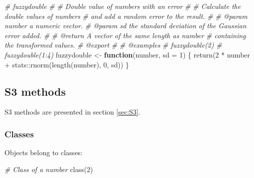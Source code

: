 \documentclass[
  12pt,
  american,
  a4paper,
  extrafontsizes,onecolumn,openright
  ]{memoir}
\newenvironment{Shaded}{\begin{snugshade}}{\end{snugshade}}
\newcommand{\AttributeTok}[1]{\textcolor[rgb]{0.77,0.63,0.00}{#1}}
\newcommand{\CommentTok}[1]{\textcolor[rgb]{0.56,0.35,0.01}{\textit{#1}}}
\newcommand{\ControlFlowTok}[1]{\textcolor[rgb]{0.13,0.29,0.53}{\textbf{#1}}}
\newcommand{\DecValTok}[1]{\textcolor[rgb]{0.00,0.00,0.81}{#1}}
\newcommand{\FunctionTok}[1]{\textcolor[rgb]{0.00,0.00,0.00}{#1}}
\newcommand{\NormalTok}[1]{#1}
\newcommand{\OtherTok}[1]{\textcolor[rgb]{0.56,0.35,0.01}{#1}}
\newcommand{\SpecialCharTok}[1]{\textcolor[rgb]{0.00,0.00,0.00}{#1}}
\begin{document}
\begin{Shaded}
\begin{Highlighting}[]
\CommentTok{\#\textquotesingle{} fuzzydouble}
\CommentTok{\#\textquotesingle{} }
\CommentTok{\#\textquotesingle{} Double value of numbers with an error}
\CommentTok{\#\textquotesingle{} }
\CommentTok{\#\textquotesingle{} Calculate the double values of numbers }
\CommentTok{\#\textquotesingle{} and add a random error to the result.}
\CommentTok{\#\textquotesingle{}}
\CommentTok{\#\textquotesingle{} @param number a numeric vector.}
\CommentTok{\#\textquotesingle{} @param sd the standard deviation of the Gaussian error added.}
\CommentTok{\#\textquotesingle{}}
\CommentTok{\#\textquotesingle{} @return A vector of the same length as \textasciigrave{}number\textasciigrave{}}
\CommentTok{\#\textquotesingle{}  containing the transformed values.}
\CommentTok{\#\textquotesingle{} @export}
\CommentTok{\#\textquotesingle{}}
\CommentTok{\#\textquotesingle{} @examples}
\CommentTok{\#\textquotesingle{} fuzzydouble(2)}
\CommentTok{\#\textquotesingle{} fuzzydouble(1:4)}
\NormalTok{fuzzydouble }\OtherTok{\textless{}{-}} \ControlFlowTok{function}\NormalTok{(number, }\AttributeTok{sd =} \DecValTok{1}\NormalTok{) \{}
    \FunctionTok{return}\NormalTok{(}\DecValTok{2} \SpecialCharTok{*}\NormalTok{ number }\SpecialCharTok{+}\NormalTok{ stats}\SpecialCharTok{::}\FunctionTok{rnorm}\NormalTok{(}\FunctionTok{length}\NormalTok{(number), }\DecValTok{0}\NormalTok{, sd))}
\NormalTok{\}}
\end{Highlighting}
\end{Shaded}

\normalsize

\hypertarget{s3-methods}{%
\subsection{S3 methods}\label{s3-methods}}

S3 methods are presented in section \ref{sec:S3}.

\hypertarget{classes}{%
\subsubsection{Classes}\label{classes}}

Objects belong to classes:

\scriptsize

\begin{Shaded}
\begin{Highlighting}[]
\CommentTok{\# Class of a number}
\FunctionTok{class}\NormalTok{(}\DecValTok{2}\NormalTok{)}
\end{Highlighting}
\end{Shaded}
\end{document}
